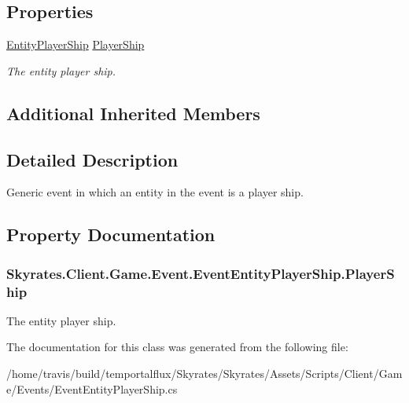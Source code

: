 \subsection*{Properties}
\begin{DoxyCompactItemize}
\item 
\hyperlink{class_skyrates_1_1_client_1_1_entity_1_1_entity_player_ship}{Entity\-Player\-Ship} \hyperlink{class_skyrates_1_1_client_1_1_game_1_1_event_1_1_event_entity_player_ship_a6f84598b8e589eeb0e102fcda0a322b9}{Player\-Ship}
\begin{DoxyCompactList}\small\item\em The entity player ship. \end{DoxyCompactList}\end{DoxyCompactItemize}
\subsection*{Additional Inherited Members}


\subsection{Detailed Description}
Generic event in which an entity in the event is a player ship. 



\subsection{Property Documentation}
\hypertarget{class_skyrates_1_1_client_1_1_game_1_1_event_1_1_event_entity_player_ship_a6f84598b8e589eeb0e102fcda0a322b9}{
\subsubsection[{Player\-Ship}]{ Skyrates.\-Client.\-Game.\-Event.\-Event\-Entity\-Player\-Ship.\-Player\-Ship\hspace{0.3cm}{\ttfamily [get]}}}\label{class_skyrates_1_1_client_1_1_game_1_1_event_1_1_event_entity_player_ship_a6f84598b8e589eeb0e102fcda0a322b9}


The entity player ship. 



The documentation for this class was generated from the following file\-:\begin{DoxyCompactItemize}
\item 
/home/travis/build/temportalflux/\-Skyrates/\-Skyrates/\-Assets/\-Scripts/\-Client/\-Game/\-Events/Event\-Entity\-Player\-Ship.\-cs\end{DoxyCompactItemize}

